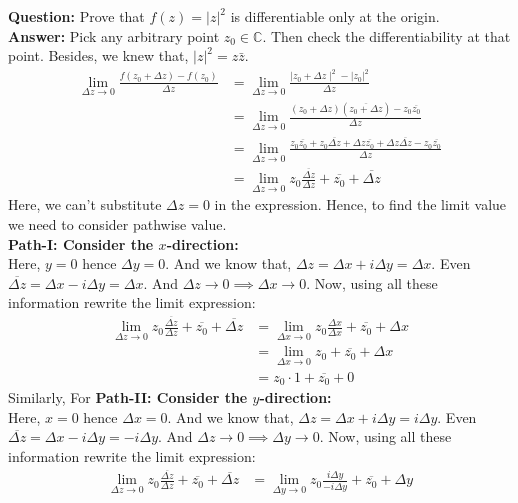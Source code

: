 \begin{example}
\textbf{Question:} Prove that $f(z) = |z|^2$ is differentiable only at the origin.\\
\textbf{Answer:} 
Pick any arbitrary point $z_0 \in\mathbb C$. Then check the differentiability at that point. Besides, we knew that, $|z|^2=z\bar z$. 
\begin{align*}
    \lim_{\Delta z\rightarrow0}\frac{f(z_0+\Delta z)-f(z_0)}{\Delta z}&= \lim_{\Delta z\rightarrow0} \frac{\mid z_0+\Delta z\mid^2 - |z_0|^2}{\Delta z}\\
    &= \lim_{\Delta z\rightarrow0} \frac{(z_0+\Delta z)(\overline{z_0+\Delta z})-z_0\overline{z_0}}{\Delta z}\\
    &= \lim_{\Delta z\rightarrow0} \frac{z_0\overline{z_0}+z_0\overline{\Delta z}+\Delta z\overline{z_0}+\Delta z\overline{\Delta z}-z_0\overline{z_0}}{\Delta z}\\
    &= \lim_{\Delta z\rightarrow0} z_0\frac{\overline{\Delta z}}{\Delta z}+\overline{z_0}+\overline{\Delta z}
\end{align*}
Here, we can't substitute $\Delta z=0$ in the expression. Hence, to find the limit value we need to consider pathwise value.\\ 
\textbf{Path-I: Consider the $x$-direction:}\\
Here, $y=0$ hence $\Delta y=0$. And we know that, $\Delta z=\Delta x+i\Delta y=\Delta x$. Even $\overline{\Delta z}=\Delta x - i\Delta y=\Delta x$. And $\Delta z\rightarrow 0 \implies \Delta x\rightarrow 0$. Now, using all these information rewrite the limit expression:
\begin{align*}
    \lim_{\Delta z\rightarrow0} z_0\frac{\overline{\Delta z}}{\Delta z}+\overline{z_0}+\overline{\Delta z} &= \lim_{\Delta x\rightarrow 0} z_0 \frac{\Delta x}{\Delta x} + \overline{z_0} + \Delta x\\
    &= \lim_{\Delta x\rightarrow 0} z_0 + \overline{z_0} +\Delta x\\
    &= \boxed{z_0\cdot 1 + \overline{z_0} + 0}
\end{align*}
Similarly, For \textbf{Path-II: Consider the $y$-direction:}\\
Here, $x=0$ hence $\Delta x=0$. And we know that, $\Delta z=\Delta x+i\Delta y=i\Delta y$. Even $\overline{\Delta z}=\Delta x- i\Delta y=-i \Delta y$. And $\Delta z\rightarrow 0 \implies \Delta y\rightarrow 0$. Now, using all these information rewrite the limit expression:
\begin{align*}
    \lim_{\Delta z\rightarrow0} z_0\frac{\overline{\Delta z}}{\Delta z}+\overline{z_0}+\overline{\Delta z} &= \lim_{\Delta y\rightarrow 0} z_0 \frac{i \Delta y}{-i \Delta y} + \overline{z_0} + \Delta y\\

\end{align*}
\end{example}
